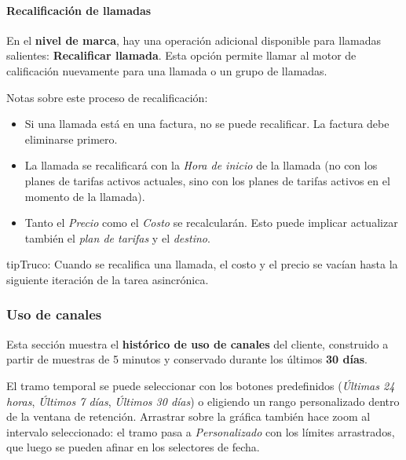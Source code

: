 \documentclass[letterpaper,10pt,spanish]{sphinxmanual}
\begin{document}
\paragraph{Recalificación de llamadas}
\label{administration_portal/client/retail/calls/call_recordings:call-rerating}
En el \textbf{nivel de marca}, hay una operación adicional disponible para llamadas salientes: \textbf{Recalificar llamada}. Esta opción permite llamar al motor de calificación nuevamente para una llamada o un grupo de llamadas.

Notas sobre este proceso de recalificación:
\begin{itemize}
\item {} 
Si una llamada está en una factura, no se puede recalificar. La factura debe eliminarse primero.

\item {} 
La llamada se recalificará con la \emph{Hora de inicio} de la llamada (no con los planes de tarifas activos actuales, sino con los planes de tarifas activos en el momento de la llamada).

\item {} 
Tanto el \emph{Precio} como el \emph{Costo} se recalcularán. Esto puede implicar actualizar también el \emph{plan de tarifas} y el \emph{destino}.

\end{itemize}

\begin{notice}{tip}{Truco:}
Cuando se recalifica una llamada, el costo y el precio se vacían hasta la siguiente iteración de la tarea asincrónica.
\end{notice}


\subsubsection{Uso de canales}
\label{administration_portal/client/retail/calls/channel_usage:channel-usage}\label{administration_portal/client/retail/calls/channel_usage::doc}
Esta sección muestra el \textbf{histórico de uso de canales} del cliente, construido a partir de muestras de 5 minutos y conservado durante los últimos \textbf{30 días}.

El tramo temporal se puede seleccionar con los botones predefinidos (\emph{Últimas 24 horas}, \emph{Últimos 7 días}, \emph{Últimos 30 días}) o eligiendo un rango personalizado dentro de la ventana de retención. Arrastrar sobre la gráfica también hace zoom al intervalo seleccionado: el tramo pasa a \emph{Personalizado} con los límites arrastrados, que luego se pueden afinar en los selectores de fecha.
\end{document}
